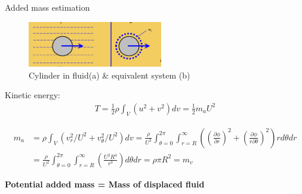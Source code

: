 \documentclass[9pt, xcolor=table]{beamer}
\begin{document}
\begin{frame}{Added mass estimation}
	\setlength{\parindent}{2em}
	\begin{figure}
		\centering\includegraphics[height=2cm]{未标题-5.jpg}
		\caption{Cylinder in fluid(a) \& equivalent system (b)}
	\end{figure}	

	Kinetic energy: 
	\begin{equation}
		\begin{gathered}
		T=\frac{1}{2} \rho \int_{V}\left(u^{2}+v^{2}\right) d v
		=\frac{1}{2} m_{a} U^{2}
		\end{gathered}
	\end{equation}
	
	\noindent\begin{equation}
		\begin{aligned}
		m_{a} &=\rho \int_{V}\left(v_{r}^{2} / U^{2}+v_{\theta}^{2} / U^{2}\right) d v=\frac{\rho}{U^{2}} \int_{\theta=0}^{2 \pi} \int_{r=R}^{\infty}\left(\left(\frac{\partial \phi}{\partial r}\right)^{2}+\left(\frac{\partial \phi}{r \partial \theta}\right)^{2}\right) r d \theta d r \\
		&=\frac{\rho}{U^{2}} \int_{\theta=0}^{2 \pi} \int_{r=R}^{\infty}\left(\frac{U^{2} R^{4}}{r^{3}}\right) d \theta d r=\rho \pi R^{2} = m_v
		\end{aligned}
	\end{equation}
	\vspace{1em}

	\centering
	\Large\textbf{Potential added mass = Mass of displaced fluid}
	
\end{frame}
\end{document}
